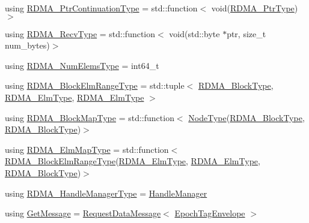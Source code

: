 \begin{DoxyCompactItemize}
\item 
using \hyperlink{namespacevt_1_1rdma_a6e46099fefaf428990d215e6e6d12645}{R\+D\+M\+A\+\_\+\+Ptr\+Continuation\+Type} = std\+::function$<$ void(\hyperlink{namespacevt_aab05b4a584f7ee835a6d0f66915cf59b}{R\+D\+M\+A\+\_\+\+Ptr\+Type})$>$
\item 
using \hyperlink{namespacevt_1_1rdma_a36020f2b7ae371b6ddc8ec9caffb72d2}{R\+D\+M\+A\+\_\+\+Recv\+Type} = std\+::function$<$ void(std\+::byte $\ast$ptr, size\+\_\+t num\+\_\+bytes)$>$
\item 
using \hyperlink{namespacevt_1_1rdma_aff1991e64aa5ac8d63d7dea0a82aaff3}{R\+D\+M\+A\+\_\+\+Num\+Elems\+Type} = int64\+\_\+t
\item 
using \hyperlink{namespacevt_1_1rdma_a8320f97b4a2866df60d9778486dbcd0f}{R\+D\+M\+A\+\_\+\+Block\+Elm\+Range\+Type} = std\+::tuple$<$ \hyperlink{namespacevt_ae54d2ca8f6bb4d65faf65118c82cd6f7}{R\+D\+M\+A\+\_\+\+Block\+Type}, \hyperlink{namespacevt_a2c2a902092b72056f70210c159f966f0}{R\+D\+M\+A\+\_\+\+Elm\+Type}, \hyperlink{namespacevt_a2c2a902092b72056f70210c159f966f0}{R\+D\+M\+A\+\_\+\+Elm\+Type} $>$
\item 
using \hyperlink{namespacevt_1_1rdma_a049e294a5236ad30692253d5f82886c9}{R\+D\+M\+A\+\_\+\+Block\+Map\+Type} = std\+::function$<$ \hyperlink{namespacevt_a866da9d0efc19c0a1ce79e9e492f47e2}{Node\+Type}(\hyperlink{namespacevt_ae54d2ca8f6bb4d65faf65118c82cd6f7}{R\+D\+M\+A\+\_\+\+Block\+Type}, \hyperlink{namespacevt_ae54d2ca8f6bb4d65faf65118c82cd6f7}{R\+D\+M\+A\+\_\+\+Block\+Type})$>$
\item 
using \hyperlink{namespacevt_1_1rdma_a6798ab36a5dcb8749c25dff719f9ce07}{R\+D\+M\+A\+\_\+\+Elm\+Map\+Type} = std\+::function$<$ \hyperlink{namespacevt_1_1rdma_a8320f97b4a2866df60d9778486dbcd0f}{R\+D\+M\+A\+\_\+\+Block\+Elm\+Range\+Type}(\hyperlink{namespacevt_a2c2a902092b72056f70210c159f966f0}{R\+D\+M\+A\+\_\+\+Elm\+Type}, \hyperlink{namespacevt_a2c2a902092b72056f70210c159f966f0}{R\+D\+M\+A\+\_\+\+Elm\+Type}, \hyperlink{namespacevt_ae54d2ca8f6bb4d65faf65118c82cd6f7}{R\+D\+M\+A\+\_\+\+Block\+Type})$>$
\item 
using \hyperlink{namespacevt_1_1rdma_a09c31fc860965bddd7a22f6adceb96fd}{R\+D\+M\+A\+\_\+\+Handle\+Manager\+Type} = \hyperlink{structvt_1_1rdma_1_1_handle_manager}{Handle\+Manager}
\item 
using \hyperlink{namespacevt_1_1rdma_acce0da4c9ea1233c3f132c1971943653}{Get\+Message} = \hyperlink{structvt_1_1rdma_1_1_request_data_message}{Request\+Data\+Message}$<$ \hyperlink{namespacevt_af23b58014ced6898422213a0e5e6a27a}{Epoch\+Tag\+Envelope} $>$

\end{DoxyCompactItemize}
